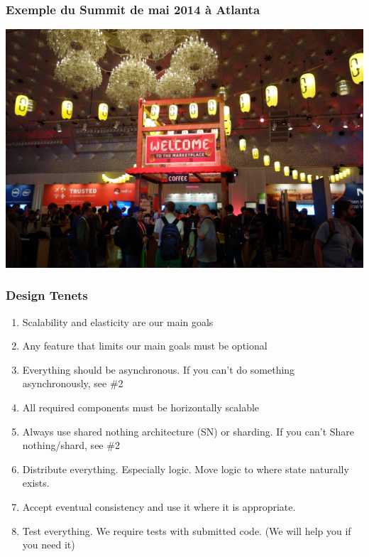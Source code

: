   \begin{frame}
    \frametitle{Exemple du Summit de mai 2014 à Atlanta}
    \includegraphics[width=\textwidth]{images/photo-summit2.jpg}
  \end{frame}
  \begin{frame}
    \frametitle{Design Tenets}
    \begin{enumerate}
      \item Scalability and elasticity are our main goals
      \item Any feature that limits our main goals must be optional
      \item Everything should be asynchronous. If you can't do something asynchronously, see \#2
      \item All required components must be horizontally scalable
      \item Always use shared nothing architecture (SN) or sharding. If you can't Share nothing/shard, see \#2
      \item Distribute everything. Especially logic. Move logic to where state naturally exists.
      \item Accept eventual consistency and use it where it is appropriate.
      \item Test everything. We require tests with submitted code. (We will help you if you need it)
    \end{enumerate}
  \end{frame}

